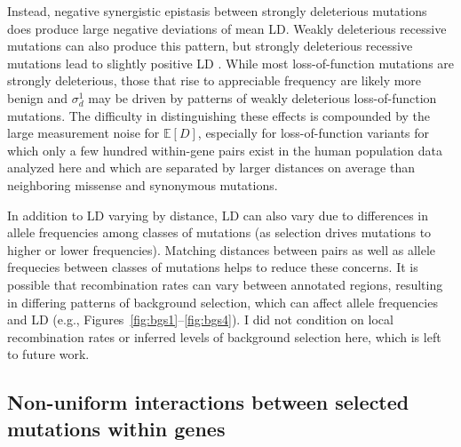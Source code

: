 \documentclass[]{article}
\newcommand{\E}{\mathbb{E}}
\begin{document}
Instead, negative synergistic epistasis between strongly deleterious mutations
does produce large negative deviations of mean LD. Weakly deleterious
recessive mutations can also produce this pattern, but strongly deleterious
recessive mutations lead to slightly positive LD \citep{Roze2021-cf}. While
most loss-of-function mutations are strongly deleterious, those that rise to
appreciable frequency are likely more benign and \(\sigma_d^1\) may be driven
by patterns of weakly deleterious loss-of-function mutations. The difficulty in
distinguishing these effects is compounded by the large measurement noise for
\(\E[D]\), especially for loss-of-function variants for which only a few
hundred within-gene pairs exist in the human population data analyzed here and
which are separated by larger distances on average than neighboring missense
and synonymous mutations.

In addition to LD varying by distance, LD can also vary due to differences in
allele frequencies among classes of mutations (as selection drives mutations to
higher or lower frequencies). Matching distances between pairs as well as
allele frequecies between classes of mutations helps to reduce these concerns.
It is possible that recombination rates can vary between annotated regions,
resulting in differing patterns of background selection, which can affect
allele frequencies and LD (e.g., Figures~\ref{fig:bgs1}--\ref{fig:bgs4}). I did
not condition on local recombination rates or inferred levels of background
selection here, which is left to future work.

\subsection{Non-uniform interactions between selected mutations within genes}
\end{document}
